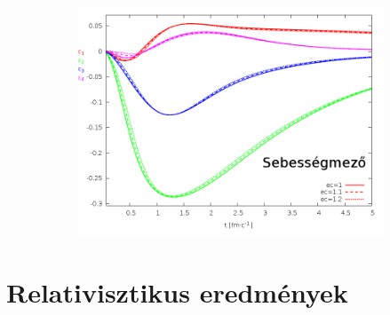 \documentclass{beamer}
\begin{document}
\begin{frame}
\begin{center}
\begin{figure}[H]
\begin{subfigure}[b]{0.49\textwidth}
        	\includegraphics[width=\textwidth]{pic/res/nonrel/eps_ec_v}
	\end{subfigure}
\end{figure}
\end{center}
\end{frame}

\section{Relativisztikus eredmények}
\end{document}
